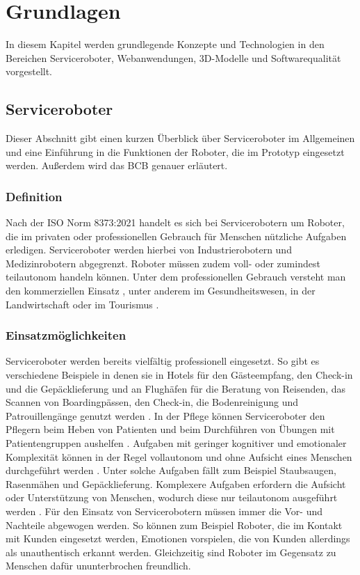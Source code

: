 \newpage
\section{Grundlagen}\label{Grundlagen}
In diesem Kapitel werden grundlegende Konzepte und Technologien in den Bereichen Serviceroboter, Webanwendungen, 3D-Modelle und Softwarequalität vorgestellt.

\subsection{Serviceroboter}
Dieser Abschnitt gibt einen kurzen Überblick über Serviceroboter im Allgemeinen und eine Einführung in die Funktionen der Roboter, die im Prototyp eingesetzt werden. Außerdem wird das \ac{BCB} genauer erläutert.

\subsubsection{Definition}
Nach der ISO Norm 8373:2021 handelt es sich bei Servicerobotern um Roboter, die im privaten oder professionellen Gebrauch für Menschen nützliche Aufgaben erledigen. Serviceroboter werden hierbei von Industrierobotern und Medizinrobotern abgegrenzt. Roboter müssen zudem voll- oder zumindest teilautonom handeln können.\cite[S.~1-2]{ISO2021} Unter dem professionellen Gebrauch versteht man den kommerziellen Einsatz \cite[S.~4]{GonzalezAguirre2021}, unter anderem im Gesundheitswesen, in der Landwirtschaft oder im Tourismus \cite[S.~9]{GonzalezAguirre2021}.

\subsubsection{Einsatzmöglichkeiten}
Serviceroboter werden bereits vielfältig professionell eingesetzt. So gibt es verschiedene Beispiele in denen sie in Hotels für den Gästeempfang, den Check-in und die Gepäcklieferung und an Flughäfen für die Beratung von Reisenden, das Scannen von Boardingpässen, den Check-in, die Bodenreinigung und Patrouillengänge genutzt werden \cite[S.~425]{Paluch2020}. In der Pflege können Serviceroboter den Pflegern beim Heben von Patienten und beim Durchführen von Übungen mit Patientengruppen aushelfen \cite[S.~427]{Paluch2020}. Aufgaben mit geringer kognitiver und emotionaler Komplexität können in der Regel vollautonom und ohne Aufsicht eines Menschen durchgeführt werden \cite[S.~429]{Paluch2020}. Unter solche Aufgaben fällt zum Beispiel Staubsaugen, Rasenmähen und Gepäcklieferung. Komplexere Aufgaben erfordern die Aufsicht oder Unterstützung von Menschen, wodurch diese nur teilautonom ausgeführt werden \cite[S.~430-431]{Paluch2020}. Für den Einsatz von Servicerobotern müssen immer die Vor- und Nachteile abgewogen werden. So können zum Beispiel Roboter, die im Kontakt mit Kunden eingesetzt werden, Emotionen vorspielen, die von Kunden allerdings als unauthentisch erkannt werden. Gleichzeitig sind Roboter im Gegensatz zu Menschen dafür ununterbrochen freundlich.\cite[S.~427]{Paluch2020}

